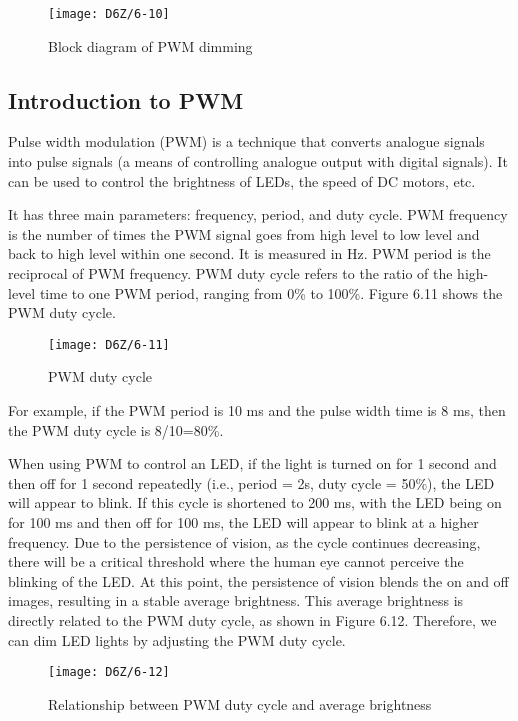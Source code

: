\documentclass[a4paper,12pt]{book}
\begin{document}
\begin{figure}[h!]
    \centering
    \texttt{[image: D6Z/6-10]}
    \caption{Block diagram of PWM dimming}
\end{figure}

\subsection{Introduction to PWM}
Pulse width modulation (PWM) is a technique that converts analogue signals into pulse signals (a means of controlling analogue output with digital signals). It can be used to control the brightness of LEDs, the speed of DC motors, etc.

It has three main parameters: frequency, period, and duty cycle. PWM frequency is the number of times the PWM signal goes from high level to low level and back to high level within one second. It is measured in Hz. PWM period is the reciprocal of PWM frequency. PWM duty cycle refers to the ratio of the high-level time to one PWM period, ranging from 0\% to 100\%. Figure 6.11 shows the PWM duty cycle.

\begin{figure}[h!]
    \centering
    \texttt{[image: D6Z/6-11]}
    \caption{PWM duty cycle}
\end{figure}

For example, if the PWM period is 10 ms and the pulse width time is 8 ms, then the PWM duty cycle is 8/10=80\%.
    
When using PWM to control an LED, if the light is turned on for 1 second and then off for 1 second repeatedly (i.e., period = 2s, duty cycle = 50\%), the LED will appear to blink. If this cycle is shortened to 200 ms, with the LED being on for 100 ms and then off for 100 ms, the LED will appear to blink at a higher frequency. Due to the persistence of vision, as the cycle continues decreasing, there will be a critical threshold where the human eye cannot perceive the blinking of the LED. At this point, the persistence of vision blends the on and off images, resulting in a stable average brightness. This average brightness is directly related to the PWM duty cycle, as shown in Figure 6.12. Therefore, we can dim LED lights by adjusting the PWM duty cycle.

\begin{figure}[h!]
    \centering
    \texttt{[image: D6Z/6-12]}
    \caption{Relationship between PWM duty cycle and average brightness}
\end{figure}
\end{document}
